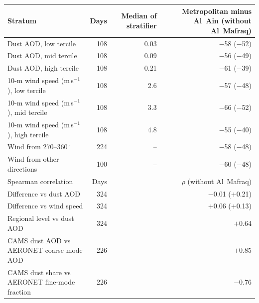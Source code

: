 \begin{tabular}{lrrr}
\toprule
Stratum & Days & Median of stratifier & Metropolitan minus Al~Ain (without Al~Mafraq) \\
\midrule
Dust AOD, low tercile & 108 & 0.03 & $-$58 ($-$52) \\
Dust AOD, mid tercile & 108 & 0.09 & $-$56 ($-$49) \\
Dust AOD, high tercile & 108 & 0.21 & $-$61 ($-$39) \\
\midrule
10-m wind speed (m\,s$^{-1}$), low tercile & 108 & 2.6 & $-$57 ($-$48) \\
10-m wind speed (m\,s$^{-1}$), mid tercile & 108 & 3.3 & $-$66 ($-$52) \\
10-m wind speed (m\,s$^{-1}$), high tercile & 108 & 4.8 & $-$55 ($-$40) \\
\midrule
Wind from 270--360$^{\circ}$ & 224 & -- & $-$58 ($-$48) \\
Wind from other directions & 100 & -- & $-$60 ($-$48) \\
\midrule
Spearman correlation & Days & \multicolumn{2}{r}{$\rho$ (without Al~Mafraq)} \\
\midrule
Difference vs dust AOD & 324 & \multicolumn{2}{r}{$-$0.01 ($+$0.21)} \\
Difference vs wind speed & 324 & \multicolumn{2}{r}{$+$0.06 ($+$0.13)} \\
Regional level vs dust AOD & 324 & \multicolumn{2}{r}{$+$0.64} \\
CAMS dust AOD vs AERONET coarse-mode AOD & 226 & \multicolumn{2}{r}{$+$0.85} \\
CAMS dust share vs AERONET fine-mode fraction & 226 & \multicolumn{2}{r}{$-$0.76} \\
\bottomrule
\end{tabular}
